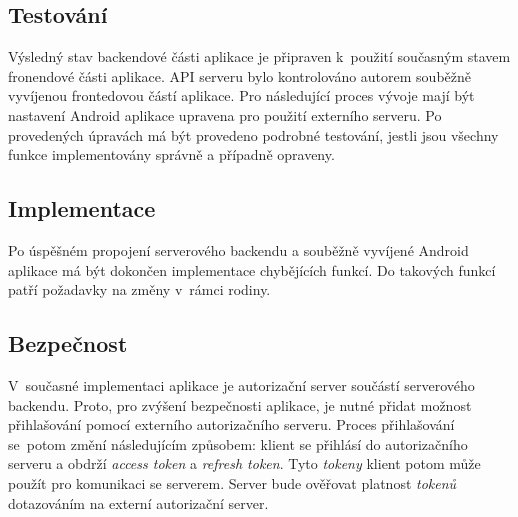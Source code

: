     \subsection{Testování}
        Výsledný stav backendové části aplikace je připraven k~použití současným stavem fronendové části aplikace. API serveru bylo kontrolováno autorem souběžně vyvíjenou frontedovou částí aplikace. Pro následující proces vývoje mají být nastavení Android aplikace upravena pro použití externího serveru. Po provedených úpravách má být provedeno podrobné testování, jestli jsou všechny funkce implementovány správně a případně opraveny.
    
    \subsection{Implementace}
        Po úspěšném propojení serverového backendu a souběžně vyvíjené Android aplikace má být dokončen implementace chybějících funkcí. Do takových funkcí patří požadavky na změny v~rámci rodiny. 
        
    \subsection{Bezpečnost}
        V~současné implementaci aplikace je autorizační server součástí serverového backendu. Proto, pro zvýšení bezpečnosti aplikace, je nutné přidat možnost přihlašování pomocí externího autorizačního serveru. Proces přihlašování se~potom změní následujícím způsobem: klient se přihlásí do autorizačního serveru a obdrží \textit{access token} a \textit{refresh token}. 
        Tyto \textit{tokeny} klient potom může použít pro komunikaci se serverem. Server bude ověřovat platnost \textit{tokenů} dotazováním na externí autorizační server.

